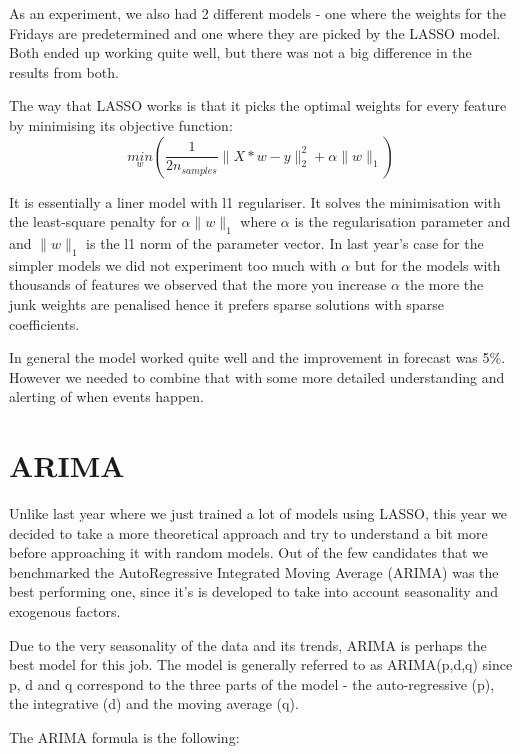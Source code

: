 \documentclass[minf,twoside,singlespacing,parskip,notimes,deptreport]{infthesis} %
\begin{document}
As an experiment, we also had 2 different models - one where the weights for the Fridays are predetermined and one where they are picked by the LASSO model. Both ended up working quite well, but there was not a big difference in the results from both. 

The way that LASSO works is that it picks the optimal weights for every feature by minimising its objective function:
\begin{equation}
\underset{w}{min}({\frac{1}{2n_{samples}}} \|X*w - y \|_2^2 + \alpha\|w\|_1)
\end{equation}

It is essentially a liner model with l1 regulariser. It solves the minimisation with the least-square penalty for $\alpha\|w\|_1$ where $\alpha$ is the regularisation parameter and and $\|w\|_1$ is the l1 norm of the parameter vector. In last year's case for the simpler models we did not experiment too much with $\alpha$ but for the models with thousands of features we observed that the more you increase $\alpha$ the more the junk weights are penalised hence it prefers sparse solutions with sparse coefficients. 

In general the model worked quite well and the improvement in forecast was 5\%. However we needed to combine that with some more detailed understanding and alerting of when events happen. 



\section{ARIMA}

Unlike last year where we just trained a lot of models using LASSO, this year we decided to take a more theoretical approach and try to understand a bit more before approaching it with random models. Out of the few candidates that we benchmarked the AutoRegressive Integrated Moving Average (ARIMA) was the best performing one, since it's is developed to take into account seasonality and exogenous factors. 

Due to the very seasonality of the data and its trends, ARIMA is perhaps the best model for this job. The model is generally referred to as ARIMA(p,d,q) since p, d and q correspond to the three parts of the model - the auto-regressive (p), the integrative (d) and the moving average (q).

The ARIMA formula is the following:
\end{document}
